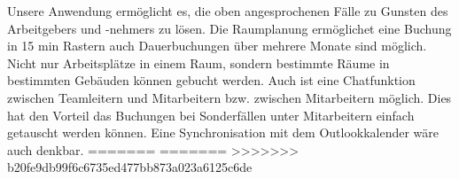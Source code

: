 \documentclass[
    12pt,
    headings=big,
    version=first,
    ngerman,
    a4paper,
    BCOR=5mm,
    DIV=14,
    1headlines,
    pagesize,
    oneside,
    openright,
    titlepage,
    headsepline,
    chapterprefix=false,
    bibliography=totoc,
    toc=graduated,
    listof=graduated,
    numbers=noenddot,
    cleardoublepage=empty,
    fleqn,
    parskip=half,
]{scrbook}
\begin{document}
Unsere Anwendung ermöglicht es, die oben angesprochenen Fälle zu Gunsten des Arbeitgebers und -nehmers zu lösen. 
Die Raumplanung ermöglichet eine Buchung in 15 min Rastern auch Dauerbuchungen über mehrere Monate sind möglich. 
Nicht nur Arbeitsplätze in einem Raum, sondern bestimmte Räume in bestimmten Gebäuden können gebucht werden. 
Auch ist eine Chatfunktion zwischen Teamleitern und Mitarbeitern bzw. zwischen Mitarbeitern möglich. 
Dies hat den Vorteil das Buchungen bei Sonderfällen unter Mitarbeitern einfach getauscht werden können. 
Eine Synchronisation mit dem Outlookkalender wäre auch denkbar.
=======
=======
>>>>>>> b20fe9db99f6c6735ed477bb873a023a6125c6de






% 


\end{document}
